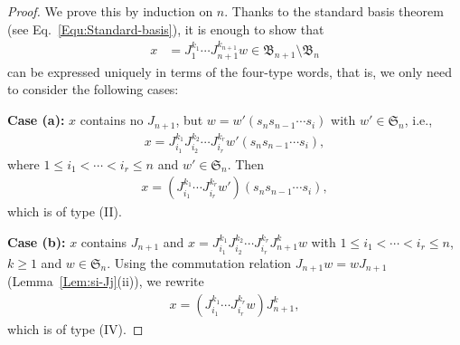 \documentclass[a4paper, oneside]{amsart}
\numberwithin{equation}{section}
\theoremstyle{definition}
\theoremstyle{remark}
\begin{document}
\begin{proof}We prove this by induction on $n$.
Thanks to the standard basis theorem \cite[Theorem~7.5.6]{K} (see Eq.~\eqref{Equ:Standard-basis}), it is enough to show that \begin{align*}
x &= J_1^{k_1} \cdots J_{n+1}^{k_{n+1}} w \in \mathfrak{B}_{n+1}\setminus \mathfrak{B}_n
\end{align*}
can be expressed uniquely in terms of the four-type words, that is, we only need to consider the following cases:

\textbf{Case (a):} $x$ contains no $J_{n+1}$, but $w = w'(s_n s_{n-1} \cdots s_i)$ with $w'\in \mathfrak{S}_{n}$, i.e.,  \begin{align*}
  x = J_{i_1}^{k_1}J_{i_2}^{k_2} \cdots J_{i_r}^{k_r}w'(s_n s_{n-1} \cdots s_i),\end{align*} where $1 \leq i_1 < \cdots < i_r \leq n$ and $w'\in \mathfrak{S}_{n}$. Then
\begin{align*}x = (J_{i_1}^{k_1} \cdots J_{i_r}^{k_r}w')(s_n s_{n-1} \cdots s_i),\end{align*}
which is of type (II).

\textbf{Case (b):}  $x$ contains $J_{n+1}$ and \(x = J_{i_1}^{k_1}J_{i_2}^{k_2} \cdots J_{i_r}^{k_r}J_{n+1}^{k}w\) with \(1 \leq i_1 < \cdots < i_r \leq n\), $k\geq 1$ and \(w \in  \mathfrak{S}_{n}\). Using the commutation relation $J_{n+1}w=wJ_{n+1}$ (Lemma~\ref{Lem:si-Jj}(ii)), we rewrite
 \begin{align*}x = \left(J_{i_1}^{k_1} \cdots J_{i_r}^{k_r}w\right) J_{n+1}^{k},\end{align*}
  which is of type (IV).




\end{proof}
\end{document}
